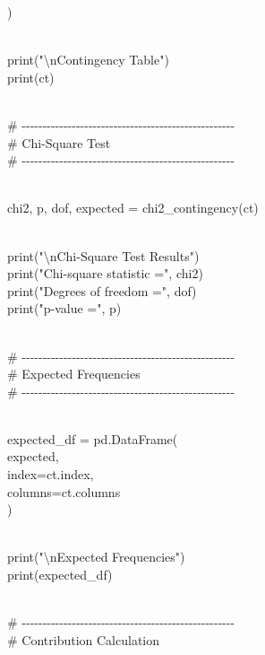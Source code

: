 \documentclass[
]{article}
\begin{document}
)\\
\strut \\
print("\textbackslash nContingency Table")\\
print(ct)\\
\strut \\
\#
-\/-\/-\/-\/-\/-\/-\/-\/-\/-\/-\/-\/-\/-\/-\/-\/-\/-\/-\/-\/-\/-\/-\/-\/-\/-\/-\/-\/-\/-\/-\/-\/-\/-\/-\/-\/-\/-\/-\/-\/-\/-\/-\/-\/-\/-\/-\/-\/-\/-\/-\\
\# Chi-Square Test\\
\#
-\/-\/-\/-\/-\/-\/-\/-\/-\/-\/-\/-\/-\/-\/-\/-\/-\/-\/-\/-\/-\/-\/-\/-\/-\/-\/-\/-\/-\/-\/-\/-\/-\/-\/-\/-\/-\/-\/-\/-\/-\/-\/-\/-\/-\/-\/-\/-\/-\/-\/-\\
\strut \\
chi2, p, dof, expected = chi2\_contingency(ct)\\
\strut \\
print("\textbackslash nChi-Square Test Results")\\
print("Chi-square statistic =", chi2)\\
print("Degrees of freedom =", dof)\\
print("p-value =", p)\\
\strut \\
\#
-\/-\/-\/-\/-\/-\/-\/-\/-\/-\/-\/-\/-\/-\/-\/-\/-\/-\/-\/-\/-\/-\/-\/-\/-\/-\/-\/-\/-\/-\/-\/-\/-\/-\/-\/-\/-\/-\/-\/-\/-\/-\/-\/-\/-\/-\/-\/-\/-\/-\/-\\
\# Expected Frequencies\\
\#
-\/-\/-\/-\/-\/-\/-\/-\/-\/-\/-\/-\/-\/-\/-\/-\/-\/-\/-\/-\/-\/-\/-\/-\/-\/-\/-\/-\/-\/-\/-\/-\/-\/-\/-\/-\/-\/-\/-\/-\/-\/-\/-\/-\/-\/-\/-\/-\/-\/-\/-\\
\strut \\
expected\_df = pd.DataFrame(\\
expected,\\
index=ct.index,\\
columns=ct.columns\\
)\\
\strut \\
print("\textbackslash nExpected Frequencies")\\
print(expected\_df)\\
\strut \\
\#
-\/-\/-\/-\/-\/-\/-\/-\/-\/-\/-\/-\/-\/-\/-\/-\/-\/-\/-\/-\/-\/-\/-\/-\/-\/-\/-\/-\/-\/-\/-\/-\/-\/-\/-\/-\/-\/-\/-\/-\/-\/-\/-\/-\/-\/-\/-\/-\/-\/-\/-\\
\# Contribution Calculation\\
\end{document}
